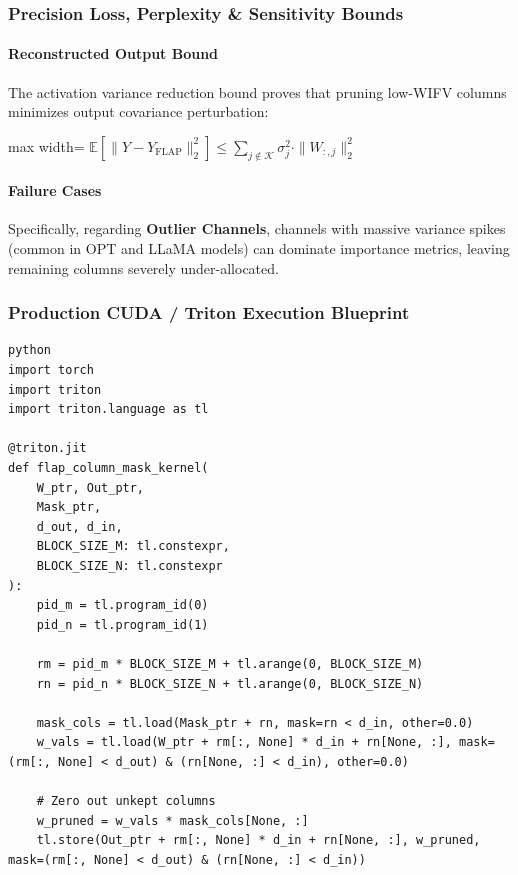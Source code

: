 \subsubsection*{Precision Loss, Perplexity \& Sensitivity Bounds}

\paragraph{Reconstructed Output Bound}

The activation variance reduction bound proves that pruning low-WIFV columns minimizes output covariance perturbation:

\begin{center}
\begin{adjustbox}{max width=\columnwidth}
$\displaystyle
\mathbb{E}\left[ \| Y - Y_{\text{FLAP}} \|_2^2 \right] \le \sum_{j \notin \mathcal{K}} \sigma_j^2 \cdot \| W_{:, j} \|_2^2
$
\end{adjustbox}
\end{center}

\paragraph{Failure Cases}

Specifically, regarding \textbf{Outlier Channels}, channels with massive variance spikes (common in OPT and LLaMA models) can dominate importance metrics, leaving remaining columns severely under-allocated.



\subsubsection*{Production CUDA / Triton Execution Blueprint}

\vspace{0.5em}
\begin{mdframed}[backgroundcolor=codebg, linecolor=codeframe, linewidth=1pt, roundcorner=4pt, innerleftmargin=2pt, innerrightmargin=5pt, innertopmargin=5pt, innerbottommargin=5pt]
\begin{lstlisting}
python
import torch
import triton
import triton.language as tl

@triton.jit
def flap_column_mask_kernel(
    W_ptr, Out_ptr,
    Mask_ptr,
    d_out, d_in,
    BLOCK_SIZE_M: tl.constexpr,
    BLOCK_SIZE_N: tl.constexpr
):
    pid_m = tl.program_id(0)
    pid_n = tl.program_id(1)

    rm = pid_m * BLOCK_SIZE_M + tl.arange(0, BLOCK_SIZE_M)
    rn = pid_n * BLOCK_SIZE_N + tl.arange(0, BLOCK_SIZE_N)

    mask_cols = tl.load(Mask_ptr + rn, mask=rn < d_in, other=0.0)
    w_vals = tl.load(W_ptr + rm[:, None] * d_in + rn[None, :], mask=(rm[:, None] < d_out) & (rn[None, :] < d_in), other=0.0)

    # Zero out unkept columns
    w_pruned = w_vals * mask_cols[None, :]
    tl.store(Out_ptr + rm[:, None] * d_in + rn[None, :], w_pruned, mask=(rm[:, None] < d_out) & (rn[None, :] < d_in))
\end{lstlisting}
\end{mdframed}
\vspace{0.5em}


